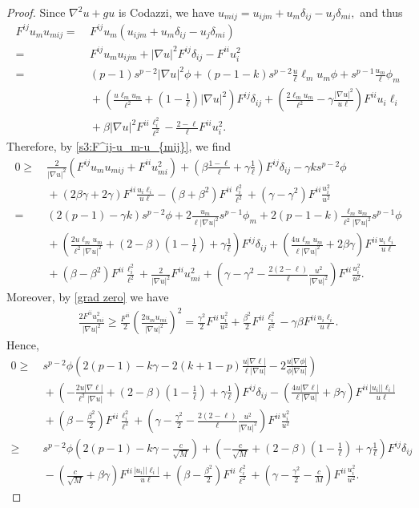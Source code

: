 \documentclass[12pt]{amsart}
\numberwithin{equation}{section}
\newcommand{\8}{\infty}
\newcommand{\de}{\delta}
\newcommand{\eq}[1]{\begin{equation}\begin{alignedat}{2}#1\end{alignedat}\end{equation}}
\begin{document}
\begin{proof}
Since $\nabla^2u+gu$ is Codazzi, we have
$
u_{mij} =u_{ijm}+u_m \de_{ij}-u_j\de_{mi},
$
and thus
\eq{
F^{ij}u_mu_{mij}
= &~ F^{ij} u_m(u_{ijm}+u_m \de_{ij}-u_j\de_{mi}) \\
=&~F^{ij}u_mu_{ijm}+|\nabla u|^2 F^{ij}\de_{ij}-F^{ii}u_i^2\\
=&~(p-1)s^{p-2}|\nabla u|^2\phi+(p-1-k)s^{p-2}\frac{u}{\ell}\ell_m u_m \phi+s^{p-1}\frac{u_m}{\ell} \phi_m\\
&~+\left(\frac{u\ell_m u_m }{\ell^2} +(1-\frac{1}{\ell})|\nabla u|^2\right)F^{ij}\de_{ij}+\left(\frac{2\ell_mu_m}{\ell^2}-\gamma\frac{|\nabla u|^2}{u\ell}\right)F^{ii}u_i\ell_i\\
&~+\beta|\nabla u|^2F^{ii}\frac{\ell_i^2}{\ell^2}-\frac{2-\ell}{\ell}F^{ii}u_i^2.
}
Therefore, by \eqref{s3:F^ij-u_m-u_{mij}}, we find
\eq{
0 \geq &~\frac{2}{|\nabla u|^2}(F^{ij}u_m u_{mij}+ F^{ii}u_{mi}^2)+\left(\beta\frac{1-\ell}{\ell}+\gamma\frac{1}{\ell}\right)F^{ij}\de_{ij}-\gamma k s^{p-2}\phi\\
&~+(2\beta\gamma+2\gamma) F^{ii}\frac{u_i \ell_i}{u\ell}-(\beta+\beta^2)F^{ii}\frac{\ell_i^2}{\ell^2}+(\gamma-\gamma^2)F^{ii}\frac{u_i^2}{u^2}\\
=&~(2(p-1)-\gamma k)s^{p-2}\phi+2\frac{u_m}{\ell|\nabla u|^2} s^{p-1}\phi_m+2(p-1-k)\frac{\ell_m u_m }{\ell^2|\nabla u|^2}s^{p-1}\phi\\
&~+\left(\frac{2u\ell_m u_m }{\ell^2|\nabla u|^2} +(2-\beta)(1-\frac{1}{\ell})+\gamma\frac{1}{\ell}\right)F^{ij}\de_{ij}+\left(\frac{4u\ell_mu_m}{\ell|\nabla u|^2}+2\beta\gamma\right)F^{ii}\frac{u_i\ell_i}{u\ell}\\
&~+(\beta-\beta^2) F^{ii}\frac{\ell_i^2}{\ell^2}+\frac{2}{|\nabla u|^2}F^{ii}u_{mi}^2+\left(\gamma-\gamma^2-\frac{2(2-\ell)}{\ell}\frac{u^2}{|\nabla u|^2}\right)F^{ii}\frac{u_i^2}{u^2}.
}
Moreover, by \eqref{grad zero} we have
\eq{
\frac{2F^{ii} u_{mi}^2}{|\nabla u|^2}
\geq \frac{F^{ii}}{2}\left(\frac{2u_m u_{mi}}{|\nabla u|^2}\right)^2
=\frac{\gamma^2}{2}F^{ii}\frac{u_i^2}{u^2}
+\frac{\beta^2}{2}F^{ii}\frac{\ell_i^2}{\ell^2}
-\gamma\beta F^{ii}\frac{u_i\ell_i}{u\ell}.
}
Hence,
\eq{
0 \geq &~s^{p-2}\phi\left( 2(p-1)-k\gamma-2(k+1-p)\frac{u|\nabla\ell|}{\ell |\nabla u|}-2\frac{u|\nabla \phi|}{\phi|\nabla u|}\right)\\
&~+\left(-\frac{2u|\nabla\ell|}{\ell^2|\nabla u|} +(2-\beta)(1-\frac{1}{\ell})+\gamma\frac{1}{\ell}\right)F^{ij}\de_{ij}
-\left(\frac{4u|\nabla \ell|}{\ell|\nabla u|}+\beta\gamma\right)F^{ii}\frac{|u_i||\ell_i|}{u\ell}\\
&~+\left(\beta-\frac{\beta^2}{2}\right) F^{ii}\frac{\ell_i^2}{\ell^2}
+\left(\gamma-\frac{\gamma^2}{2}-\frac{2(2-\ell)}{\ell}\frac{u^2}{|\nabla u|^2}\right)F^{ii}\frac{u_i^2}{u^2}\\
\geq &~s^{p-2}\phi\left( 2(p-1)-k\gamma-\frac{c}{\sqrt{M}}\right)
+\left(-\frac{c}{\sqrt{M}} +(2-\beta)(1-\frac{1}{\ell})+\gamma\frac{1}{\ell}\right)F^{ij}\de_{ij}\\
&~-\left(\frac{c}{\sqrt{M}}+\beta\gamma\right) F^{ii}\frac{|u_i||\ell_i|}{u\ell}
+\left(\beta-\frac{\beta^2}{2}\right) F^{ii}\frac{\ell_i^2}{\ell^2}
+\left(\gamma-\frac{\gamma^2}{2}-\frac{c}{M}\right)F^{ii}\frac{u_i^2}{u^2}.
}


\end{proof}
\end{document}
